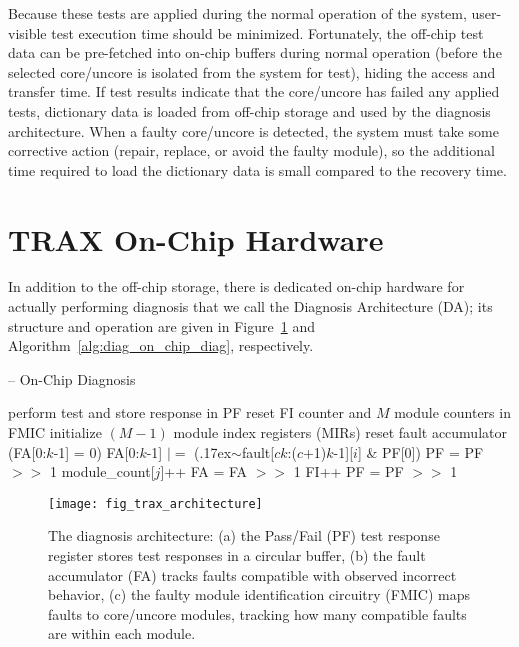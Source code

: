 Because these tests are applied during the normal operation of the system, user-visible test execution time should be minimized.
%
Fortunately, the off-chip test data can be pre-fetched into on-chip buffers during normal operation (before the selected core/uncore is isolated from the system for test), hiding the access and transfer time.
%
If test results indicate that the core/uncore has failed any applied tests, dictionary data is loaded from off-chip storage and used by the diagnosis architecture.
%
When a faulty core/uncore is detected, the system must take some corrective action (repair, replace, or avoid the faulty module), so the additional time required to load the dictionary data is small compared to the recovery time.


\section{TRAX On-Chip Hardware}
\label{sec:diag_on_chip_hw}

In addition to the off-chip storage, there is dedicated on-chip hardware for actually performing diagnosis that we call the Diagnosis Architecture (DA); its structure and operation are given in Figure~\ref{fig:diag_trax_architecture} and Algorithm~\ref{alg:diag_on_chip_diag}, respectively.

\begin{algorithm}
\centering
\caption[On-Chip Diagnosis]{-- On-Chip Diagnosis}
\label{alg:diag_on_chip_diag}
\begin{algorithmic}[1]
\STATE perform test and store response in PF
\STATE reset FI counter and $M$ module counters in FMIC
\STATE initialize $(M - 1)$ module index registers (MIRs)
  \STATE reset fault accumulator (FA[0:$k$-1] = 0)
        \STATE FA[0:$k$-1] $|=$ ({\raise.17ex\hbox{$\scriptstyle\sim$}}fault[$ck$:($c$+1)$k$-1][$i$] \& PF[0])
        \STATE PF = PF $>>$ 1
    \ENDFOR
                    \STATE module\_count[$j$]++
                \ENDIF
            \ENDIF
        \ENDFOR
        \STATE FA = FA $>>$ 1
        \STATE FI++
    \ENDFOR
        \STATE PF = PF $>>$ 1
    \ENDFOR
\ENDFOR
\end{algorithmic}
\end{algorithm}

\begin{figure}[hbtp]
\centering
\texttt{[image: fig\_trax\_architecture]}
\caption{The diagnosis architecture: (a) the Pass/Fail (PF) test response register stores test responses in a circular buffer, (b) the fault accumulator (FA) tracks faults compatible with observed incorrect behavior, (c) the faulty module identification circuitry (FMIC) maps faults to core/uncore modules, tracking how many compatible faults are within each module.}
\label{fig:diag_trax_architecture}
\end{figure}

